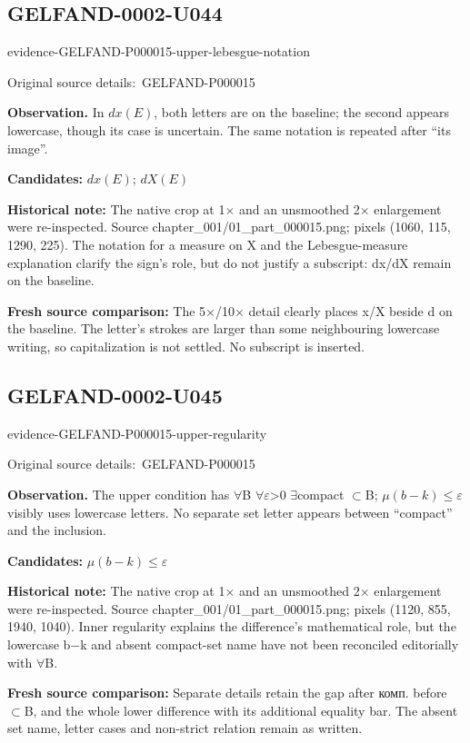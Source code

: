 \documentclass[11pt]{article}
\newcommand{\EvidenceBlock}[4]{%
 \par\smallskip\noindent\begin{minipage}{\linewidth}
 \begin{minipage}[t]{.47\linewidth}\vspace{0pt}\centering
 \csname evidence-#1-#2\endcsname\par
 {\scriptsize\SourceCropCaption\ #1}\par
 \end{minipage}\hfill
 \begin{minipage}[t]{.49\linewidth}\vspace{0pt}\raggedright
 {\small\color{orange!65!black}\textbf{#4} #3}\par
 \end{minipage}
 \end{minipage}\par\smallskip}
\newcommand{\SourceCropCaption}{Original source details:}\newcommand{\ReadingCaption}{Uncertain reading.}\newcommand{\IncompleteCaption}{Undeciphered passage.}\newcommand{\DiagramCaption}{Diagram and typed description.}
\begin{document}
\subsection*{GELFAND-0002-U044}
\EvidenceBlock{GELFAND-P000015}{upper-lebesgue-notation}{In \(dx(E)\), both letters are on the baseline; the second appears lowercase, though its case is uncertain. The same notation is repeated after “its image”.}{Observation.}
\par\smallskip\noindent\textbf{Candidates: } \(dx(E)\); \(dX(E)\)\par
\par\smallskip\noindent\textbf{Historical note: } The native crop at 1× and an unsmoothed 2× enlargement were re-inspected. Source chapter\_001/01\_part\_000015.png; pixels (1060, 115, 1290, 225). The notation for a measure on X and the Lebesgue-measure explanation clarify the sign’s role, but do not justify a subscript: dx/dX remain on the baseline.\par
\par\smallskip\noindent\textbf{Fresh source comparison: } The 5×/10× detail clearly places x/X beside d on the baseline. The letter’s strokes are larger than some neighbouring lowercase writing, so capitalization is not settled. No subscript is inserted.\par

\subsection*{GELFAND-0002-U045}
\EvidenceBlock{GELFAND-P000015}{upper-regularity}{The upper condition has \(\forall\)B \(\forall\)\(\varepsilon\)>0 \(\exists\)compact \(\subset\)B; \(\mu(b-k)\leq\varepsilon\) visibly uses lowercase letters. No separate set letter appears between “compact” and the inclusion.}{Observation.}
\par\smallskip\noindent\textbf{Candidates: } \(\mu(b-k)\leq\varepsilon\)\par
\par\smallskip\noindent\textbf{Historical note: } The native crop at 1× and an unsmoothed 2× enlargement were re-inspected. Source chapter\_001/01\_part\_000015.png; pixels (1120, 855, 1940, 1040). Inner regularity explains the difference’s mathematical role, but the lowercase b−k and absent compact-set name have not been reconciled editorially with \(\forall\)B.\par
\par\smallskip\noindent\textbf{Fresh source comparison: } Separate details retain the gap after комп. before \(\subset\)B, and the whole lower difference with its additional equality bar. The absent set name, letter cases and non-strict relation remain as written.\par
\end{document}
